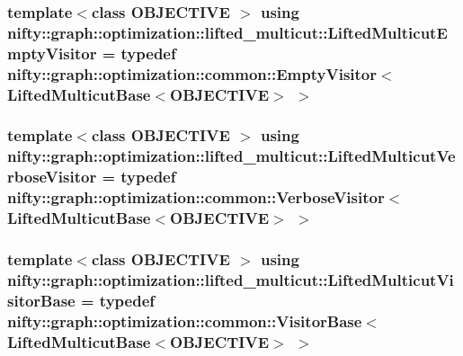 \subsubsection[{Lifted\+Multicut\+Empty\+Visitor}]{\setlength{\rightskip}{0pt plus 5cm}template$<$class O\+B\+J\+E\+C\+T\+I\+V\+E $>$ using {\bf nifty\+::graph\+::optimization\+::lifted\+\_\+multicut\+::\+Lifted\+Multicut\+Empty\+Visitor} = typedef {\bf nifty\+::graph\+::optimization\+::common\+::\+Empty\+Visitor}$<$ {\bf Lifted\+Multicut\+Base}$<$O\+B\+J\+E\+C\+T\+I\+V\+E$>$ $>$}\label{namespacenifty_1_1graph_1_1optimization_1_1lifted__multicut_a344995f0dd906c91911dcf3bc4b53397}
\hypertarget{namespacenifty_1_1graph_1_1optimization_1_1lifted__multicut_a5bff2c59860c848ec87e90add5a70d47}{}
\subsubsection[{Lifted\+Multicut\+Verbose\+Visitor}]{\setlength{\rightskip}{0pt plus 5cm}template$<$class O\+B\+J\+E\+C\+T\+I\+V\+E $>$ using {\bf nifty\+::graph\+::optimization\+::lifted\+\_\+multicut\+::\+Lifted\+Multicut\+Verbose\+Visitor} = typedef {\bf nifty\+::graph\+::optimization\+::common\+::\+Verbose\+Visitor}$<$ {\bf Lifted\+Multicut\+Base}$<$O\+B\+J\+E\+C\+T\+I\+V\+E$>$ $>$}\label{namespacenifty_1_1graph_1_1optimization_1_1lifted__multicut_a5bff2c59860c848ec87e90add5a70d47}
\hypertarget{namespacenifty_1_1graph_1_1optimization_1_1lifted__multicut_a7fba9b4f2086d28c7448955f4af4a0de}{}
\subsubsection[{Lifted\+Multicut\+Visitor\+Base}]{\setlength{\rightskip}{0pt plus 5cm}template$<$class O\+B\+J\+E\+C\+T\+I\+V\+E $>$ using {\bf nifty\+::graph\+::optimization\+::lifted\+\_\+multicut\+::\+Lifted\+Multicut\+Visitor\+Base} = typedef {\bf nifty\+::graph\+::optimization\+::common\+::\+Visitor\+Base}$<$ {\bf Lifted\+Multicut\+Base}$<$O\+B\+J\+E\+C\+T\+I\+V\+E$>$ $>$}\label{namespacenifty_1_1graph_1_1optimization_1_1lifted__multicut_a7fba9b4f2086d28c7448955f4af4a0de}
\hypertarget{namespacenifty_1_1graph_1_1optimization_1_1lifted__multicut_a9dd0bd3a8572b292340fd5914c7ce0f4}{}
